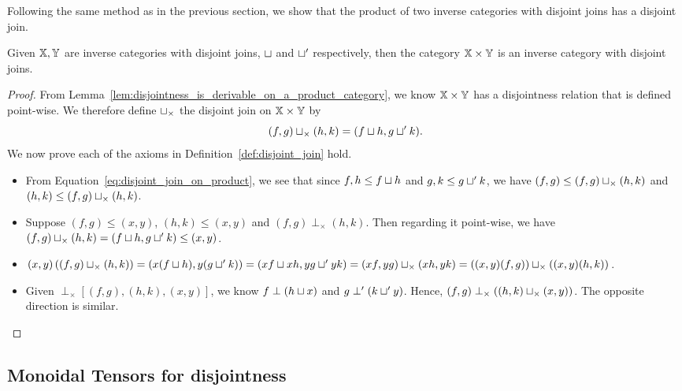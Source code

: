 Following the same method as in the previous section, we show that the product of two
inverse categories with disjoint joins has a disjoint join.
\begin{lemma}\label{lem:disjoint_join_is_in_product_category}
  Given $\mathbb{X}, \mathbb{Y}$ are inverse categories with disjoint joins, $\sqcup$ and $\sqcup'$ respectively,
  then the category $\mathbb{X} \times \mathbb{Y}$ is an inverse category with disjoint joins.
\end{lemma}
\begin{proof}
  From Lemma~\ref{lem:disjointness_is_derivable_on_a_product_category}, we know $\mathbb{X}\times\mathbb{Y}$ has a
  disjointness relation that is defined point-wise.  We therefore define $\sqcup_{\times}$ the
  disjoint join on $\mathbb{X}\times\mathbb{Y}$ by
  \begin{equation}
    (f,g)\sqcup_{\times}(h,k) = (f \sqcup h, g \sqcup' k). \label{eq:disjoint_join_on_product}
  \end{equation}
  We now prove each of the axioms in Definition~\ref{def:disjoint_join} hold.
  \begin{itemize}
    \item [\axiom{DJ}{1}] From Equation~\eqref{eq:disjoint_join_on_product}, we see that since
      $f,h \le f \sqcup h$ and $g,k \le g \sqcup' k$, we have $(f,g) \le (f,g)\sqcup_{\times}(h,k)$
      and  $(h,k) \le (f,g)\sqcup_{\times}(h,k)$.
    \item [\axiom{DJ}{2}] Suppose $(f,g) \le (x,y)$, $(h,k) \le (x,y)$ and $(f,g) \perp_{\times}
      (h,k)$. Then regarding it point-wise, we have $(f,g)\sqcup_{\times}(h,k) = (f \sqcup h, g
      \sqcup' k) \le (x,y)$.
    \item [\axiom{DJ}{3}] $(x,y)\left((f,g)\sqcup_{\times}(h,k)\right) = (x(f \sqcup h), y(g
      \sqcup' k)) = (x f \sqcup x h, y g \sqcup' y k) = (x f,y g)\sqcup_{\times}(x h,y k) =
      ((x,y)(f,g))\sqcup_{\times}((x,y)(h,k))$.
    \item [\axiom{DJ}{4}] Given $\perp_{\times}\!\![(f,g),(h,k),(x,y)]$, we know $f \perp (h\sqcup
      x)$ and $g \perp' (k\sqcup' y)$. Hence, $(f,g) \perp_{\times}((h,k)\sqcup_{\times}(x,y))$. The
      opposite direction is similar.
  \end{itemize}
\end{proof}


\subsection{Monoidal Tensors for disjointness} %
\label{sub:tensors_for_disjointness}

